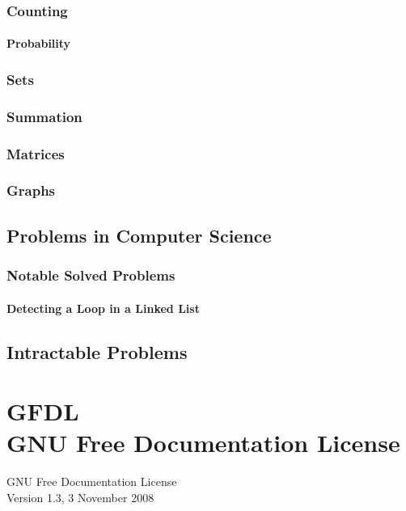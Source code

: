 \documentclass[oneside,12pt]{memoir} %
\begin{document}
\section{Counting}
\label{counting}
\subsection{Probability}
\label{sub:probability}
\section{Sets}
\section{Summation}
\section{Matrices}
\section{Graphs}
\label{graphs}
\chapter{Problems in Computer Science}
\section{Notable Solved Problems}
\label{notable_solved_problems}
\subsection{Detecting a Loop in a Linked List}
\label{detecting_a_loop_in_a_linked_list}
\chapter{Intractable Problems}
\part{%
GFDL\\
GNU Free Documentation License}




GNU Free Documentation License\\

Version 1.3, 3 November 2008\\
\end{document}
